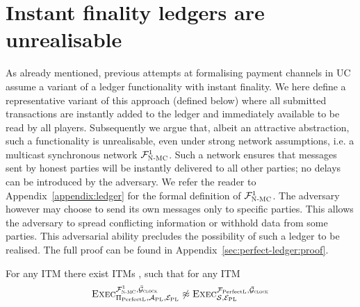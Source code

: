 \section{Instant finality ledgers are unrealisable}
\label{sec:perfect-ledger}
  As already mentioned, previous attempts at formalising payment channels in  
UC~\cite{DBLP:conf/ccs/DziembowskiFH18,Malavolta:2017:CPP:3133956.3134096,sprites,perun}
  assume a variant of a ledger functionality with instant finality. We here
  define a representative variant of this approach \perfectledger{}
  (defined below) where all submitted transactions are
  instantly added to the ledger and immediately available to be read by all
  players. Subsequently we argue that, albeit an attractive abstraction, such a
  functionality is unrealisable, even under strong network assumptions, i.e. a
  multicast synchronous network $\mathcal{F}_{\textsc{N-MC}}^1$. Such a network ensures that
  messages sent by honest parties will be instantly delivered to all other
  parties; no delays can be introduced by the adversary. We refer the
  reader to Appendix~\ref{appendix:ledger} for the formal definition of
  $\mathcal{F}_{\textsc{N-MC}}^1$.
  The adversary however may choose to send its own messages only to
  specific parties. This allows the adversary to spread conflicting information
  or withhold data from some parties. This adversarial ability
  precludes the possibility of such a  ledger
  to be realised. 
 The full proof can be found in
 Appendix~\ref{sec:perfect-ledger:proof}.

  \begin{theorem}
    \label{theorem:perfectledger}
    For any ITM \perfectprot{} there exist ITMs \perfectenv,
    \perfectadv{} such that for any ITM \simulator
    \begin{equation*}
      \textsc{Exec}^{\mathcal{F}_{\textsc{N-MC}}^1, \bar{\mathcal{G}}_{\textsc{clock}}}_{\Pi_{\mathrm{PerfectL}},
      \mathcal{A}_{\mathrm{PL}}, \mathcal{E}_{\mathrm{PL}}} \not\approx
      \textsc{Exec}^{\mathcal{F}_{\mathrm{PerfectL}}, \bar{\mathcal{G}}_{\textsc{clock}}}_{\mathcal{S},
      \mathcal{E}_{\mathrm{PL}}}
    \end{equation*}
  \end{theorem}

